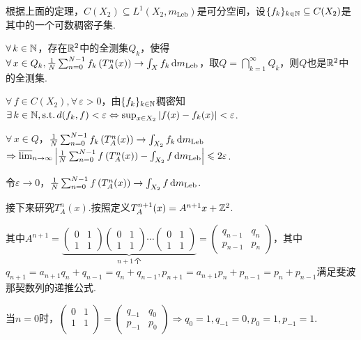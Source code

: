 根据上面的定理，$C(X_2)\subseteq L^1(X_2,m_\mathrm{Leb})$是可分空间，设$\{f_k\}_{k\in\mb{N}}\subseteq C(X_2)$是其中的一个可数稠密子集.\par
$\forall\, k\in\mb{N}$，存在$\mb{R}^2$中的全测集$Q_k$，使得$\forall\, x\in Q_k,\frac{1}{N}\sum_{n=0}^{N-1}{f_k \left(T^n_A(x)\right)}\to \int_X{f_k}\d m_\mathrm{Leb}$，取$Q=\bigcap_{k=1}^\infty{Q_k}$，则$Q$也是$\mb{R}^2$中的全测集.\par
$\forall\, f\in C(X_2),\forall\, \varepsilon>0$，由$\{f_k\}_{k\in\mb{N}}$稠密知$\exists\, k\in\mb{N},\st d(f_k,f)<\varepsilon \Leftrightarrow \sup_{x\in X_2}{|f(x)-f_k(x)|}<\varepsilon$.\par
$\forall\, x\in Q$，$\frac{1}{N}\sum_{n=0}^{N-1}{f_k \left(T^n_A(x)\right)}\to \int_{X_2}{f_k}\d m_\mathrm{Leb}$$\Rightarrow \varlimsup_{n\to\infty}{\left|\frac{1}{N}\sum_{n=0}^{N-1}{f \left(T^n_A(x)\right)}-\int_{X_2}{f}\d m_\mathrm{Leb}\right|}\leq 2\varepsilon $.\par
令$\varepsilon\to 0$，$\frac{1}{N}\sum_{n=0}^{N-1}{f \left(T^n_A(x)\right)}\to \int_{X_2}{f}\d m_\mathrm{Leb}$.\par
接下来研究$T^n_A(x)$.按照定义$T^{n+1}_A(x)=A^{n+1}x+\mb{Z}^2$.\par
其中$A^{n+1}=\underbrace{\begin{pmatrix}
    0 & 1\\
    1 & 1
\end{pmatrix}\begin{pmatrix}
    0 & 1\\
    1 & 1
\end{pmatrix}\cdots\begin{pmatrix}
    0 & 1\\
    1 & 1
\end{pmatrix}}_{n+1\,\text{个}}=\begin{pmatrix}
    q_{n-1} & q_{n} \\
    p_{n-1} & p_{n}
\end{pmatrix}$，其中$q_{n+1}=a_{n+1}q_n+q_{n-1}=q_n+q_{n-1},p_{n+1}=a_{n+1}p_n+p_{n-1}=p_n+p_{n-1}$满足斐波那契数列的递推公式.\par
当$n=0$时，$\begin{pmatrix}
    0 & 1 \\
    1 & 1 \\
\end{pmatrix}=\begin{pmatrix}
    q_{-1} & q_{0} \\
    p_{-1} & p_{0}
\end{pmatrix}\Rightarrow q_0=1,q_{-1}=0,p_0=1,p_{-1}=1$.\par
$$
